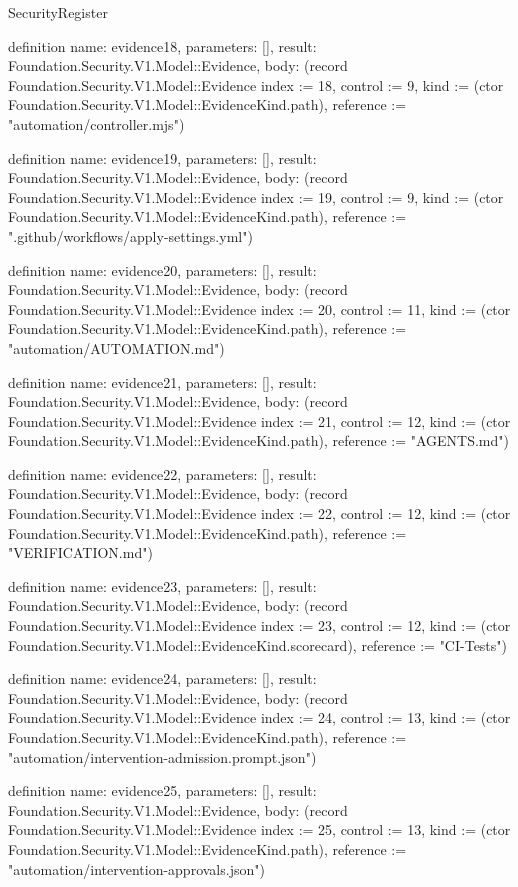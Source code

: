 \begin{lexlean}{SecurityRegister}
\begin{semanticmodule}
definition{
  name: evidence18,
  parameters: [],
  result: Foundation.Security.V1.Model::Evidence,
  body: (record Foundation.Security.V1.Model::Evidence {index := 18, control := 9, kind := (ctor Foundation.Security.V1.Model::EvidenceKind.path), reference := "automation/controller.mjs"})
}

definition{
  name: evidence19,
  parameters: [],
  result: Foundation.Security.V1.Model::Evidence,
  body: (record Foundation.Security.V1.Model::Evidence {index := 19, control := 9, kind := (ctor Foundation.Security.V1.Model::EvidenceKind.path), reference := ".github/workflows/apply-settings.yml"})
}

definition{
  name: evidence20,
  parameters: [],
  result: Foundation.Security.V1.Model::Evidence,
  body: (record Foundation.Security.V1.Model::Evidence {index := 20, control := 11, kind := (ctor Foundation.Security.V1.Model::EvidenceKind.path), reference := "automation/AUTOMATION.md"})
}

definition{
  name: evidence21,
  parameters: [],
  result: Foundation.Security.V1.Model::Evidence,
  body: (record Foundation.Security.V1.Model::Evidence {index := 21, control := 12, kind := (ctor Foundation.Security.V1.Model::EvidenceKind.path), reference := "AGENTS.md"})
}

definition{
  name: evidence22,
  parameters: [],
  result: Foundation.Security.V1.Model::Evidence,
  body: (record Foundation.Security.V1.Model::Evidence {index := 22, control := 12, kind := (ctor Foundation.Security.V1.Model::EvidenceKind.path), reference := "VERIFICATION.md"})
}

definition{
  name: evidence23,
  parameters: [],
  result: Foundation.Security.V1.Model::Evidence,
  body: (record Foundation.Security.V1.Model::Evidence {index := 23, control := 12, kind := (ctor Foundation.Security.V1.Model::EvidenceKind.scorecard), reference := "CI-Tests"})
}

definition{
  name: evidence24,
  parameters: [],
  result: Foundation.Security.V1.Model::Evidence,
  body: (record Foundation.Security.V1.Model::Evidence {index := 24, control := 13, kind := (ctor Foundation.Security.V1.Model::EvidenceKind.path), reference := "automation/intervention-admission.prompt.json"})
}

definition{
  name: evidence25,
  parameters: [],
  result: Foundation.Security.V1.Model::Evidence,
  body: (record Foundation.Security.V1.Model::Evidence {index := 25, control := 13, kind := (ctor Foundation.Security.V1.Model::EvidenceKind.path), reference := "automation/intervention-approvals.json"})
}


\end{semanticmodule}
\end{lexlean}
